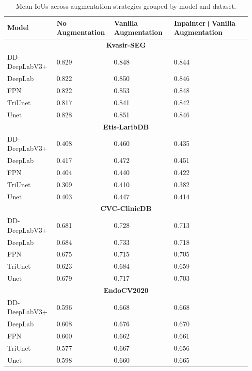 \begin{table}[h!]
    \centering
\begin{tabularx}{\linewidth}{lXXX}
\toprule
Model & No Augmentation & Vanilla Augmentation & Inpainter+Vanilla Augmentation\\
\midrule
\multicolumn{4}{c}{\textbf{Kvasir-SEG }}\\
\midrule
           DD-DeepLabV3+     & 0.829 & 0.848 & 0.844\\
           DeepLab           & 0.822 & 0.850 & 0.846\\
           FPN               & 0.822 & 0.853 & 0.848\\
           TriUnet           & 0.817 & 0.841 & 0.842\\
           Unet              & 0.828 & 0.851 & 0.846\\
\midrule
\multicolumn{4}{c}{\textbf{Etis-LaribDB}}\\
\midrule
           DD-DeepLabV3+     & 0.408 & 0.460 & 0.435\\
           DeepLab           & 0.417 & 0.472 & 0.451\\
           FPN               & 0.404 & 0.440 & 0.422\\
           TriUnet           & 0.309 & 0.410 & 0.382\\
           Unet              & 0.403 & 0.447 & 0.414\\
\midrule
\multicolumn{4}{c}{\textbf{CVC-ClinicDB}}\\
\midrule

           DD-DeepLabV3+     & 0.681 & 0.728 & 0.713\\
           DeepLab           & 0.684 & 0.733 & 0.718\\
           FPN               & 0.675 & 0.715 & 0.705\\
           TriUnet           & 0.623 & 0.684 & 0.659\\
           Unet              & 0.679 & 0.717 & 0.703\\
\midrule
\multicolumn{4}{c}{\textbf{EndoCV2020}}\\
\midrule
           DD-DeepLabV3+     & 0.596 & 0.668 & 0.668\\
           DeepLab           & 0.608 & 0.676 & 0.670\\
           FPN               & 0.600 & 0.662 & 0.661\\
           TriUnet           & 0.577 & 0.667 & 0.656\\
           Unet              & 0.598 & 0.660 & 0.665\\
\bottomrule
\end{tabularx}
    \caption{Mean IoUs across augmentation strategies grouped by model and dataset.}
    \label{tab:aug_ious}
\end{table}

